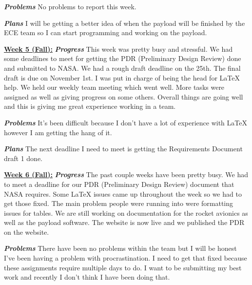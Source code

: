 \documentclass[onecolumn, draftclsnofoot, 10pt, compsoc]{IEEEtran}
\begin{document}
\textbf{\textit{{Problems}}}
\newline No problems to report this week. \newline 

\textbf{\textit{{Plans}}}
\newline I will be getting a better idea of when the payload will be finished by the ECE team so I can start programming and working on the payload. \newline 

\underline{\textbf{Week 5 (Fall):}}
\newline\textbf{\textit{{Progress}}}
\newline This week was pretty busy and stressful. We had some deadlines to meet for getting the PDR (Preliminary Design Review) done and submitted to NASA. We had a rough draft deadline on the 25th. The final draft is due on November 1st. I was put in charge of being the head for LaTeX help. We held our weekly team meeting which went well. More tasks were assigned as well as giving progress on some others. Overall things are going well and this is giving me great experience working in a team. \newline 

\textbf{\textit{{Problems}}}
\newline  It's been difficult because I don't have a lot of experience with LaTeX however I am getting the hang of it. \newline 

\textbf{\textit{{Plans}}}
\newline The next deadline I need to meet is getting the Requirements Document draft 1 done. \newline 

\underline{\textbf{Week 6 (Fall):}}
\newline\textbf{\textit{{Progress}}}
\newline The past couple weeks have been pretty busy. We had to meet a deadline for our PDR (Preliminary Design Review) document that NASA requires. Some LaTeX issues came up throughout the week so we had to get those fixed. The main problem people were running into were formatting issues for tables. We are still working on documentation for the rocket avionics as well as the payload software. The website is now live and we published the PDR on the website. \newline 

\textbf{\textit{{Problems}}}
\newline There have been no problems within the team but I will be honest I've been having a problem with procrastination. I need to get that fixed because these assignments require multiple days to do. I want to be submitting my best work and recently I don't think I have been doing that. \newline 
\end{document}
